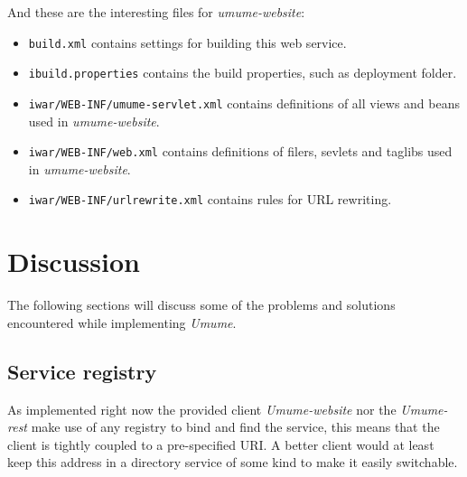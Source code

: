 \documentclass[titlepage, twocolumn, a4paper, 10pt]{article}
\begin{document}
And these are the interesting files for \textit{umume-website}:
\begin{itemize}
\item \verb!build.xml! contains settings for building this web
  service.
\item \verb!ibuild.properties! contains the build properties, such as
  deployment folder.
\item \verb!iwar/WEB-INF/umume-servlet.xml! contains definitions of
  all views and beans used in \textit{umume-website}.
\item \verb!iwar/WEB-INF/web.xml! contains definitions of filers, sevlets and
  taglibs used in \textit{umume-website}.
\item \verb!iwar/WEB-INF/urlrewrite.xml! contains rules for URL rewriting.
\end{itemize}

\section{Discussion}\label{sec:discussion}
The following sections will discuss some of the problems and solutions
encountered while implementing \textit{Umume}.


\subsection{Service registry}
As implemented right now the provided client \textit{Umume-website} nor the \textit{Umume-rest} make use of any registry to bind and find the service, this means that the client is tightly coupled to a pre-specified URI. A better client would at least keep this address in a directory service of some kind to make it easily switchable.

\subsection{}
\end{document}
